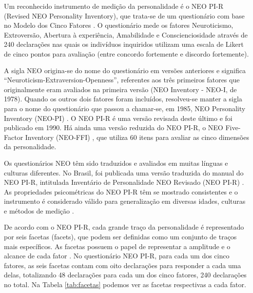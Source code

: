 
Um reconhecido instrumento de medição da personalidade é o NEO PI-R (Revised NEO Personality Inventory), que trata-se de um questionário com base no Modelo dos Cinco Fatores \cite{costa:92a}. O questionário mede os fatores Neuroticismo, Extroversão, Abertura à experiência, Amabilidade e Conscienciosidade através de 240 declarações nas quais os indivíduos inquiridos utilizam uma escala de Likert de cinco pontos para avaliação (entre concordo fortemente e discordo fortemente).

A sigla NEO origina-se do nome do questionário em versões anteriores e significa ``Neuroticism-Extraversion-Openness'', referentes aos três primeiros fatores que originalmente eram avaliados na primeira versão (NEO Inventory - NEO-I, de 1978). Quando os outros dois fatores foram incluídos, resolveu-se manter a sigla para o nome do questionário que passou a chamar-se, em 1985, NEO Personality Inventory (NEO-PI) \cite{costa:85}. O NEO PI-R é uma versão revisada deste último e foi publicado em 1990. Há ainda uma versão reduzida do NEO PI-R, o NEO Five-Factor Inventory (NEO-FFI) \cite{costa:92b}, que utiliza 60 itens para avaliar as cinco dimensões da personalidade.

Os questionários NEO têm sido traduzidos e avaliados em muitas línguas e culturas diferentes. No Brasil, foi publicada uma versão traduzida do manual do NEO PI-R, intitulada Inventário de Personalidade NEO Revisado (NEO PI-R) \cite{flores:07}. As propriedades psicométricas do NEO PI-R têm se mostrado consistentes e o instrumento é considerado válido para generalização em diversas idades, culturas e métodos de medição \cite{mccrae:11}.

De acordo com o NEO PI-R, cada grande traço da personalidade é representado por seis facetas (facets), que podem ser definidas como um conjunto de traços mais específicos. As facetas possuem o papel de representar a amplitude e o alcance de cada fator \cite{mccrae:06}. No questionário NEO PI-R, para cada um dos cinco fatores, as seis facetas contam com oito declarações para responder a cada uma delas, totalizando 48 declarações para cada um dos cinco fatores, 240 declarações no total. Na Tabela \ref{tab:facetas} podemos ver as facetas respectivas a cada fator.

